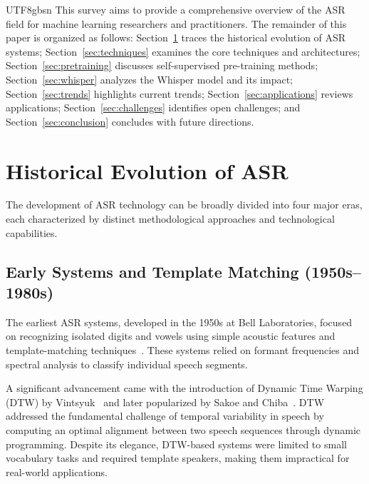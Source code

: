 \documentclass[12pt,a4paper]{article}
\begin{document}
\begin{CJK}{UTF8}{gbsn}
This survey aims to provide a comprehensive overview of the ASR field for machine learning researchers and practitioners. The remainder of this paper is organized as follows: Section~\ref{sec:history} traces the historical evolution of ASR systems; Section~\ref{sec:techniques} examines the core techniques and architectures; Section~\ref{sec:pretraining} discusses self-supervised pre-training methods; Section~\ref{sec:whisper} analyzes the Whisper model and its impact; Section~\ref{sec:trends} highlights current trends; Section~\ref{sec:applications} reviews applications; Section~\ref{sec:challenges} identifies open challenges; and Section~\ref{sec:conclusion} concludes with future directions.

\section{Historical Evolution of ASR}
\label{sec:history}

The development of ASR technology can be broadly divided into four major eras, each characterized by distinct methodological approaches and technological capabilities.

\subsection{Early Systems and Template Matching (1950s--1980s)}
\label{subsec:early}

The earliest ASR systems, developed in the 1950s at Bell Laboratories, focused on recognizing isolated digits and vowels using simple acoustic features and template-matching techniques~\cite{davis1952auditory}. These systems relied on formant frequencies and spectral analysis to classify individual speech segments.

A significant advancement came with the introduction of Dynamic Time Warping (DTW) by Vintsyuk~\cite{vintsyuk1968speech} and later popularized by Sakoe and Chiba~\cite{sakoe1978dynamic}. DTW addressed the fundamental challenge of temporal variability in speech by computing an optimal alignment between two speech sequences through dynamic programming. Despite its elegance, DTW-based systems were limited to small vocabulary tasks and required template speakers, making them impractical for real-world applications.


\end{CJK}
\end{document}
